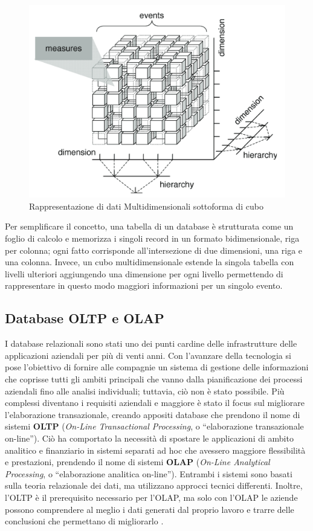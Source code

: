 \begin{figure}
    \centering
    \includegraphics[width=0.85\linewidth]{figure/capitolo_2/Multidimensional Data Cube.pdf}
    \caption{Rappresentazione di dati Multidimensionali sottoforma di cubo}
    \label{fig:Multidimensional Data Cube}
\end{figure}

Per semplificare il concetto, una tabella di un database è strutturata come un foglio di calcolo e memorizza i singoli record in un formato bidimensionale, riga per colonna; ogni fatto corrisponde all'intersezione di due dimensioni, una riga e una colonna. Invece, un cubo multidimensionale estende la singola tabella con livelli ulteriori aggiungendo una dimensione per ogni livello permettendo di rappresentare in questo modo maggiori informazioni per un singolo evento.

\subsection{Database OLTP e OLAP}

I database relazionali sono stati uno dei punti cardine delle infrastrutture delle applicazioni aziendali per più di venti anni. Con l'avanzare della tecnologia si pose l'obiettivo di fornire alle compagnie un sistema di gestione delle informazioni che coprisse tutti gli ambiti principali che vanno dalla pianificazione dei processi aziendali fino alle analisi individuali; tuttavia, ciò non è stato possibile. Più complessi diventano i requisiti aziendali e maggiore è stato il focus sul migliorare l'elaborazione transazionale, creando appositi database che prendono il nome di sistemi \textbf{OLTP} (\textit{On-Line Transactional Processing}, o ``elaborazione transazionale on-line''). Ciò ha comportato la necessità di spostare le applicazioni di ambito analitico e finanziario in sistemi separati ad hoc che avessero maggiore flessibilità e prestazioni, prendendo il nome di sistemi \textbf{OLAP} (\textit{On-Line Analytical Processing}, o ``elaborazione analitica on-line''). Entrambi i sistemi sono basati sulla teoria relazionale dei dati, ma utilizzano approcci tecnici differenti. Inoltre, l'OLTP è il prerequisito necessario per l'OLAP, ma solo con l'OLAP le aziende possono comprendere al meglio i dati generati dal proprio lavoro e trarre delle conclusioni che permettano di migliorarlo \cite{scribd_oltp_olap}.

